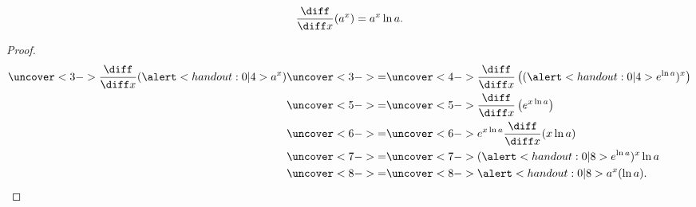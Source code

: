 \begin{frame}
\begin{theorem}
\[
\frac{\diff}{\diff x} (a^x) = a^x \ln a .
\]
\end{theorem}
\begin{proof}
\abovedisplayskip=0pt
\belowdisplayskip=0pt
\abovedisplayshortskip=0pt
\belowdisplayshortskip=0pt
\begin{align*}
\uncover<3->{\frac{\diff}{\diff x} (\alert<handout:0| 4>{a}^x)}%
& \uncover<3->{ = }  %
\uncover<4->{\frac{\diff}{\diff x} \left((\alert<handout:0| 4>{e^{\ln a}})^x\right) }\\%
& \uncover<5->{ = }  %
\uncover<5->{\frac{\diff}{\diff x}\left( e^{x\ln a}\right)}\\%
& \uncover<6->{ = }  %
\uncover<6->{ e^{x\ln a}\frac{\diff}{\diff x}(x\ln a) }\\%
& \uncover<7->{ = }  %
\uncover<7->{ (\alert<handout:0| 8>{e^{\ln a}})^x\ln a }\\%
& \uncover<8->{ = }  %
\uncover<8->{ \alert<handout:0| 8>{a}^x(\ln a).}%
\end{align*}
\end{proof}
\end{frame}

